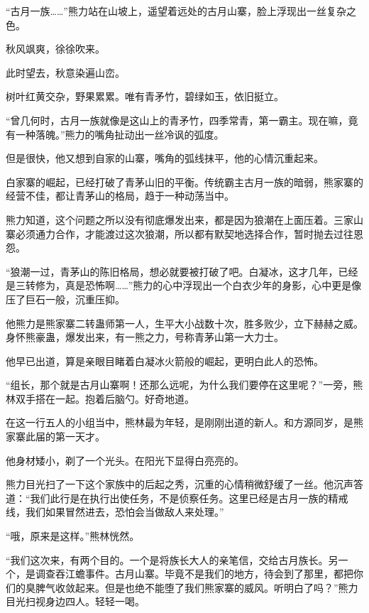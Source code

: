 
\begin{this_body}



“古月一族……”熊力站在山坡上，遥望着远处的古月山寨，脸上浮现出一丝复杂之色。

秋风飒爽，徐徐吹来。

此时望去，秋意染遍山峦。

树叶红黄交杂，野果累累。唯有青矛竹，碧绿如玉，依旧挺立。

“曾几何时，古月一族就像是这山上的青矛竹，四季常青，第一霸主。现在嘛，竟有一种落魄。”熊力的嘴角扯动出一丝冷讽的弧度。

但是很快，他又想到自家的山寨，嘴角的弧线抹平，他的心情沉重起来。

白家寨的崛起，已经打破了青茅山旧的平衡。传统霸主古月一族的暗弱，熊家寨的经营不佳，都让青茅山的格局，趋于一种动荡当中。

熊力知道，这个问题之所以没有彻底爆发出来，都是因为狼潮在上面压着。三家山寨必须通力合作，才能渡过这次狼潮，所以都有默契地选择合作，暂时抛去过往恩怨。

“狼潮一过，青茅山的陈旧格局，想必就要被打破了吧。白凝冰，这才几年，已经是三转修为，真是恐怖啊……”熊力的心中浮现出一个白衣少年的身影，心中更是像压了巨石一般，沉重压抑。

他熊力是熊家寨二转蛊师第一人，生平大小战数十次，胜多败少，立下赫赫之威。身怀熊豪蛊，爆发出来，有一熊之力，号称青茅山第一大力士。

他早已出道，算是亲眼目睹着白凝冰火箭般的崛起，更明白此人的恐怖。

“组长，那个就是古月山寨啊！还那么远呢，为什么我们要停在这里呢？”一旁，熊林双手搭在一起。抱着后脑勺。好奇地道。

在这一行五人的小组当中，熊林最为年轻，是刚刚出道的新人。和方源同岁，是熊家寨此届的第一天才。

他身材矮小，剃了一个光头。在阳光下显得白亮亮的。

熊力目光扫了一下这个家族中的后起之秀，沉重的心情稍微舒缓了一丝。他沉声答道：“我们此行是在执行出使任务，不是侦察任务。这里已经是古月一族的精戒线，我们如果冒然进去，恐怕会当做敌人来处理。”

“哦，原来是这样。”熊林恍然。

“我们这次来，有两个目的。一个是将族长大人的亲笔信，交给古月族长。另一个，是调查吞江蟾事件。古月山寨。毕竟不是我们的地方，待会到了那里，都把你们的臭脾气收敛起来。但是也绝不能堕了我们熊家寨的威风。听明白了吗？”熊力目光扫视身边四人。轻轻一喝。


\end{this_body}
